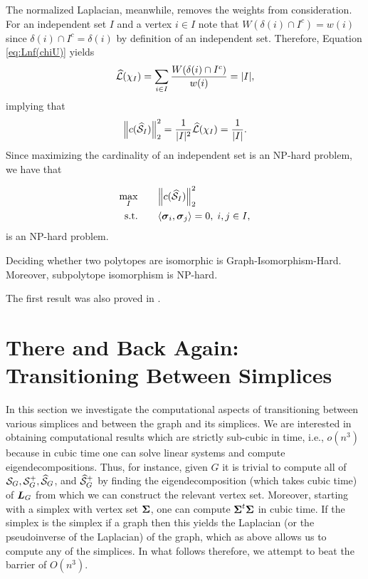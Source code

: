 The normalized Laplacian, meanwhile, removes the weights from consideration. For an independent set $I$ and a vertex $i\in I$ note that $W(\delta(i)\cap I^c)=w(i)$ since $\delta(i)\cap I^c=\delta(i)$ by definition of an independent set. Therefore, Equation \eqref{eq:Lnf(chiU)} yields 
\begin{align*}
    \widehat{\mathcal{L}}(\chi_I)=\sum_{i\in I}\frac{W(\delta(i)\cap I^c)}{w(i)} = |I|,
\end{align*}
implying that 
\[\norm{c(\widehat{\mathcal{S}}_I)}_2^2=\frac{1}{|I|^2}\widehat{\mathcal{L}}(\chi_I)=\frac{1}{|I|}.\]
Since maximizing the cardinality of an independent set is an NP-hard problem, we have that 

\begin{alignat*}{2}
\max_I & \quad &&  \norm{c(\widehat{\mathcal{S}}_I)}_2^2 \\
 \text{s.t.}&  &&  \langle \vb*{\sigma}_i,\vb*{\sigma}_j\rangle=0,\; i,j\in I,
\end{alignat*}
is an NP-hard problem.


\begin{theorem}
Deciding whether two polytopes are isomorphic is Graph-Isomorphism-Hard. Moreover, subpolytope isomorphism is NP-hard. 
\end{theorem}

The first result was also proved in \cite{kaibel2008complexity}. 


\section{There and Back Again: Transitioning Between Simplices}
In this section we investigate the computational aspects of transitioning between various simplices and between the graph and its simplices. We are interested in obtaining computational results which are strictly sub-cubic in time, i.e., $o(n^3)$ because in cubic time one can solve linear systems and compute eigendecompositions. Thus, for instance, given $G$ it is trivial to compute all of $\mathcal{S}_G,\mathcal{S}^+_G,\widehat{\mathcal{S}}_G$, and $\widehat{\mathcal{S}}_G^+$ by finding the eigendecomposition (which takes cubic time) of $\vb*{L}_G$ from which we can construct the relevant vertex set.  Moreover, starting with a simplex with vertex set $\boldsymbol{\Sigma}$, one can compute $\boldsymbol{\Sigma}^t\boldsymbol{\Sigma}$ in cubic time. If the simplex is the simplex if a graph then this yields the Laplacian (or the pseudoinverse of the Laplacian) of the graph, which as above allows us to compute any of the simplices. In what follows therefore, we attempt to beat the barrier of $O(n^3)$. 

